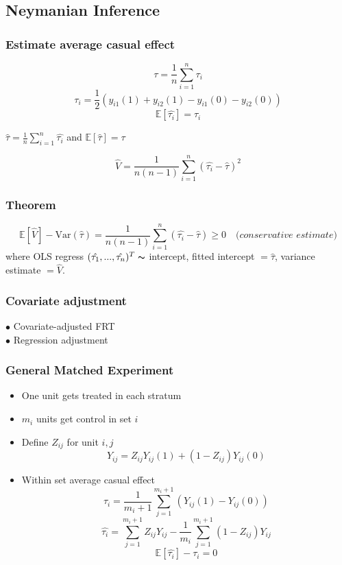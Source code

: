 \subsection{Neymanian Inference}
\subsubsection{Estimate average casual effect}
$$\tau = \frac{1}{n} \sum^{n}_{i=1}\tau_i$$
$$\tau_i = \frac{1}{2}(y_{i1}(1) + y_{i2}(1) - y_{i1}(0) - y_{i2}(0))$$
$$\mathbb{E}[\hat{\tau_i}] = \tau_i$$
\begin{center}
    $\hat{\tau} = \frac{1}{n}\sum^n_{i=1}\hat{\tau_i}$ and $\mathbb{E}[\hat{\tau}] = \tau$
\end{center}
$$\hat{V} = \frac{1}{n(n-1)}\sum^n_{i=1}(\hat{\tau_i} - \hat{\tau})^2$$

\subsubsection{Theorem}
$$\mathbb{E}[\hat{V}] - \text{Var} (\hat{\tau}) = \frac{1}{n(n-1)}\sum^n_{i=1}(\hat{\tau_i} - \hat{\tau}) \geq 0 \quad\textit{(conservative estimate)}$$
where OLS regress $(\hat{\tau_1}, ..., \hat{\tau_n})^T \thicksim$ intercept,
fitted intercept $= \hat{\tau}$,
variance estimate $= \hat{V}$.

\subsubsection{Covariate adjustment}
$\bullet$ Covariate-adjusted FRT \\
$\bullet$ Regression adjustment

\subsubsection{General Matched Experiment}
\begin{itemize}
    \item One unit gets treated in each stratum 
    \item $m_i$ units get control in set $i$
    \item Define $Z_{ij}$ for unit $i,j$
$$Y_{ij} = Z_{ij}Y_{ij}(1) + (1-Z_{ij})Y_{ij}(0)$$
    \item Within set average casual effect
$$\tau_i = \frac{1}{m_i+1} \sum^{m_i + 1}_{j=1} (Y_{ij}(1) - Y_{ij}(0))$$
$$\hat{\tau_i} = \sum^{m_i + 1}_{j=1} Z_{ij}Y_{ij} - \frac{1}{m_i} \sum^{m_i + 1}_{j=1} (1 - Z_{ij})Y_{ij} $$
$$\mathbb{E}[\hat{\tau_i}] - \tau_i = 0$$
\end{itemize}

